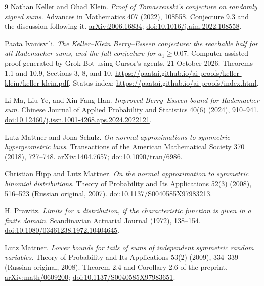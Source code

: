 \documentclass[11pt]{article}
\begin{document}
\begin{thebibliography}{9}
 Nathan Keller and Ohad Klein.
\emph{Proof of Tomaszewski's conjecture on randomly signed sums}.
Advances in Mathematics 407 (2022), 108558. Conjecture 9.3 and the discussion
following it. \href{https://arxiv.org/abs/2006.16834}{arXiv:2006.16834};
\href{https://doi.org/10.1016/j.aim.2022.108558}{doi:10.1016/j.aim.2022.108558}.

 Paata Ivanisvili.
\emph{The Keller--Klein Berry--Esseen conjecture: the reachable half for all
Rademacher sums, and the full conjecture for $a_1\ge0.07$}.
Computer-assisted proof generated by Grok Bot using Cursor's agents, 21 October 2026. Theorems 1.1 and 10.9,
Sections 3, 8, and 10.
\url{https://paatai.github.io/ai-proofs/keller-klein/keller-klein.pdf}.
Status index: \url{https://paatai.github.io/ai-proofs/index.html}.

 Li Ma, Liu Ye, and Xin-Fang Han.
\emph{Improved Berry--Esseen bound for Rademacher sum}.
Chinese Journal of Applied Probability and Statistics 40(6) (2024), 910--941.
\href{https://doi.org/10.12460/j.issn.1001-4268.aps.2024.2022121}{doi:10.12460/j.issn.1001-4268.aps.2024.2022121}.

 Lutz Mattner and Jona Schulz.
\emph{On normal approximations to symmetric hypergeometric laws}.
Transactions of the American Mathematical Society 370 (2018), 727--748.
\href{https://arxiv.org/abs/1404.7657}{arXiv:1404.7657};
\href{https://doi.org/10.1090/tran/6986}{doi:10.1090/tran/6986}.

 Christian Hipp and Lutz Mattner.
\emph{On the normal approximation to symmetric binomial distributions}.
Theory of Probability and Its Applications 52(3) (2008), 516--523
(Russian original, 2007).
\href{https://doi.org/10.1137/S0040585X97983213}{doi:10.1137/S0040585X97983213}.

 H. Prawitz.
\emph{Limits for a distribution, if the characteristic function is given in a finite domain}.
Scandinavian Actuarial Journal (1972), 138--154.
\href{https://doi.org/10.1080/03461238.1972.10404645}{doi:10.1080/03461238.1972.10404645}.

 Lutz Mattner.
\emph{Lower bounds for tails of sums of independent symmetric random variables}.
Theory of Probability and Its Applications 53(2) (2009), 334--339
(Russian original, 2008). Theorem 2.4 and Corollary 2.6 of the preprint.
\href{https://arxiv.org/abs/math/0609200}{arXiv:math/0609200};
\href{https://doi.org/10.1137/S0040585X97983651}{doi:10.1137/S0040585X97983651}.


\end{thebibliography}
\end{document}
